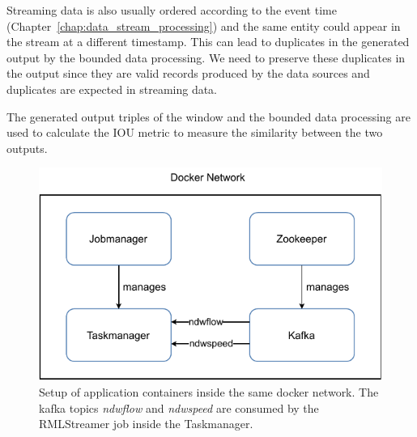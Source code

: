 Streaming data is also usually 
ordered according to the event time (Chapter~\ref{chap:data_stream_processing}) 
and the same entity could appear in the 
stream at a different timestamp. This can lead to duplicates in the generated output by 
the bounded data processing. We need to preserve these duplicates in the 
output since they are valid records produced by the data sources and duplicates are 
expected in streaming data. 


The generated output triples of the window and the bounded data processing are 
used to calculate the IOU metric to measure the similarity between the two outputs.    




\begin{figure}[htpb]
    \centering
    \includegraphics[width=0.8\linewidth]{fig/docker_setup.pdf}
    \caption{Setup of application containers inside the same docker network. 
    The kafka topics \emph{ndwflow} and \emph{ndwspeed} are consumed by the 
RMLStreamer job inside the Taskmanager. 
}%
    \label{fig:docker_setup}
\end{figure}

